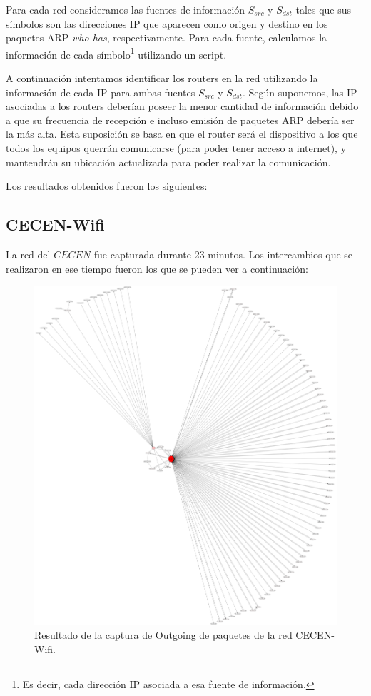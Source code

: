 \documentclass[10pt, a4paper]{article}
\begin{document}
Para cada red consideramos las fuentes de información $S_{src}$ y $S_{dst}$ tales que sus símbolos son las direcciones IP que aparecen como origen y destino en los paquetes ARP \textit{who-has}, respectivamente. Para cada fuente, calculamos la información de cada símbolo\footnote{Es decir, cada dirección IP asociada a esa fuente de información.} utilizando un script.

A continuación intentamos identificar los routers en la red utilizando la información de cada IP para ambas fuentes $S_{src}$ y $S_{dst}$. Según suponemos, las IP asociadas a los routers deberían poseer la menor cantidad de información debido a que su frecuencia de recepción e incluso emisión de paquetes ARP debería ser la más alta. Esta suposición se basa en que el router será el dispositivo a los que todos los equipos querrán comunicarse (para poder tener acceso a internet), y mantendrán su ubicación actualizada para poder realizar la comunicación.

Los resultados obtenidos fueron los siguientes:

\subsection{CECEN-Wifi}

La red del $CECEN$ fue capturada durante 23 minutos. Los intercambios que se realizaron en ese tiempo fueron los que se pueden ver a continuación:
\begin{figure}[H] %
\begin{center}
\includegraphics[width=400pt]{../imgs/cecen-outgoing.png}
\caption{Resultado de la captura de Outgoing de paquetes de la red CECEN-Wifi.}
\end{center}
\end{figure}
\end{document}

